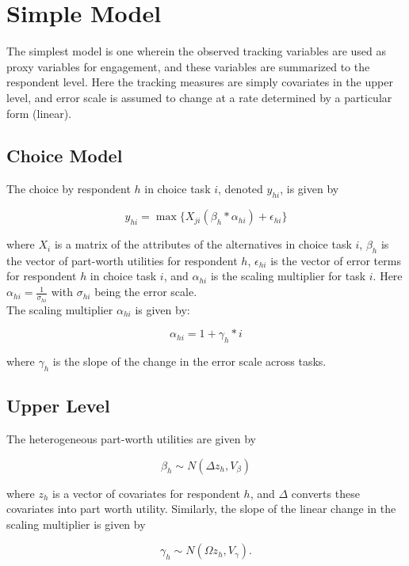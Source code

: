\documentclass[12pt]{article}
\begin{document}
\section{Simple Model}

The simplest model is one wherein the observed tracking variables are used as proxy variables for engagement, and these variables are summarized to the respondent level.  Here the tracking measures are simply covariates in the upper level, and error scale is assumed to change at a rate determined by a particular form (linear).\\

\subsection{Choice Model}
\noindent The choice by respondent $h$ in choice task $i$, denoted $y_{hi}$, is given by

$$y_{hi}=\max\{X_{ji}\left(\beta_{h}*\alpha_{hi}\right) + \epsilon_{hi}\}$$

\noindent where $X_{i}$ is a matrix of the attributes of the alternatives in choice task $i$, $\beta_h$ is the vector of part-worth utilities for respondent $h$, $\epsilon_{hi}$ is the vector of error terms for respondent $h$ in choice task $i$, and $\alpha_{hi}$ is the scaling multiplier for task $i$.  Here $\alpha_{hi}=\frac{1}{\sigma_{hi}}$ with $\sigma_{hi}$ being the error scale.\\

\noindent The scaling multiplier $\alpha_{hi}$ is given by:

$$\alpha_{hi}=1+\gamma_h*i$$

\noindent where $\gamma_h$ is the slope of the change in the error scale across tasks.\\

\subsection{Upper Level}

The heterogeneous part-worth utilities are given by

$$\beta_h \sim N(\Delta z_h,V_\beta)$$

\noindent where $z_h$ is a vector of covariates for respondent $h$, and $\Delta$ converts these covariates into part worth utility.  Similarly, the slope of the linear change in the scaling multiplier is given by

$$\gamma_h \sim N(\Omega z_h,V_\gamma).$$
\end{document}
